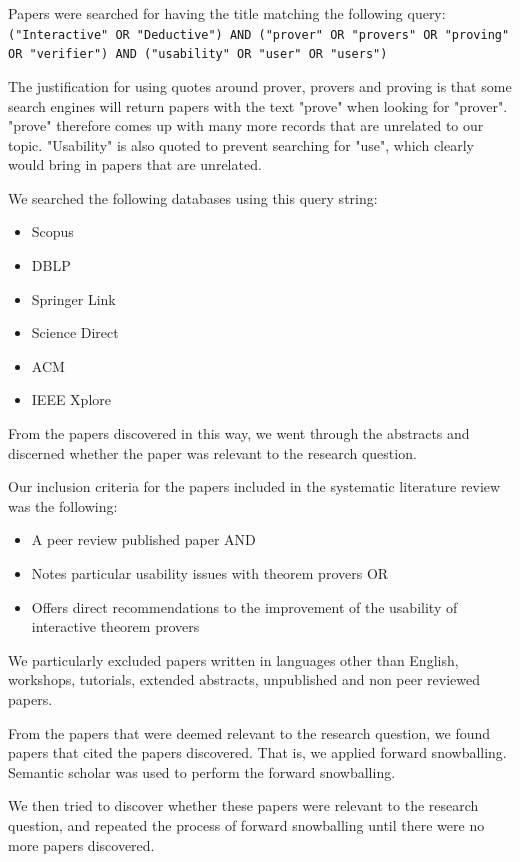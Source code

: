 \documentclass[
]{article}
\newcommand{\passthrough}[1]{#1}
\providecommand{\tightlist}{%
  \setlength{\itemsep}{0pt}\setlength{\parskip}{0pt}}
\begin{document}
Papers were searched for having the title matching the following query:
\passthrough{\lstinline!("Interactive" OR "Deductive") AND ("prover" OR "provers" OR "proving" OR "verifier") AND ("usability" OR "user" OR "users")!}

The justification for using quotes around prover, provers and proving is
that some search engines will return papers with the text "prove" when
looking for "prover". "prove" therefore comes up with many more records
that are unrelated to our topic. "Usability" is also quoted to prevent
searching for "use", which clearly would bring in papers that are
unrelated.

We searched the following databases using this query string:

\begin{itemize}
\tightlist
\item
  Scopus
\item
  DBLP
\item
  Springer Link
\item
  Science Direct
\item
  ACM
\item
  IEEE Xplore
\end{itemize}

From the papers discovered in this way, we went through the abstracts
and discerned whether the paper was relevant to the research question.

Our inclusion criteria for the papers included in the systematic
literature review was the following:

\begin{itemize}
\tightlist
\item
  A peer review published paper AND
\item
  Notes particular usability issues with theorem provers OR
\item
  Offers direct recommendations to the improvement of the usability of
  interactive theorem provers
\end{itemize}

We particularly excluded papers written in languages other than English,
workshops, tutorials, extended abstracts, unpublished and non peer
reviewed papers.

From the papers that were deemed relevant to the research question, we
found papers that cited the papers discovered. That is, we applied
forward snowballing. Semantic scholar was used to perform the forward
snowballing.

We then tried to discover whether these papers were relevant to the
research question, and repeated the process of forward snowballing until
there were no more papers discovered.
\end{document}

